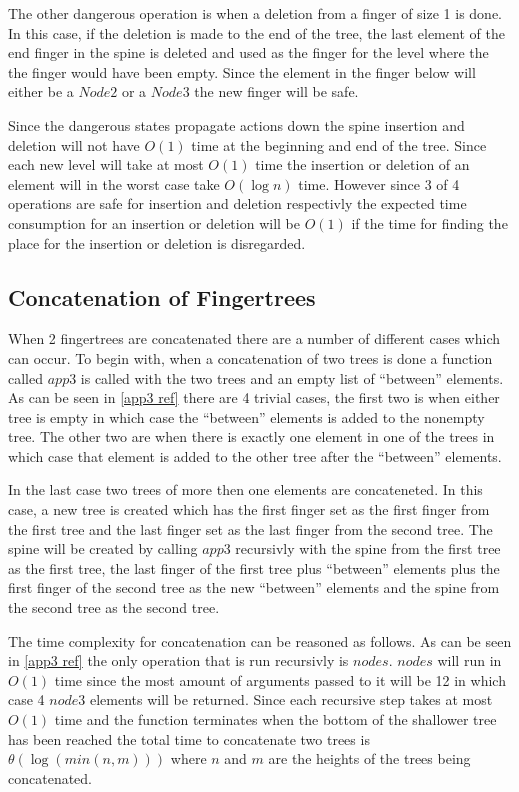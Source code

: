 The other dangerous operation is when a deletion from a finger of size 1 is
done. In this case, if the deletion is made to the end of the tree, the last
element of the end finger in the spine is deleted and used as the finger for the
level where the the finger would have been empty. Since the element in the
finger below will either be a $Node2$ or a $Node3$ the new finger will be safe.

Since the dangerous states propagate actions down the spine insertion and
deletion will not have $O(1)$ time at the beginning and end of the tree. Since
each new level will take at most $O(1)$ time the insertion or deletion of an
element will in the worst case take $O(\log n)$ time. However since 3 of 4
operations are safe for insertion and deletion respectivly the expected time
consumption for an insertion or deletion will be $O(1)$ if the time for finding
the place for the insertion or deletion is disregarded.

\subsection{Concatenation of Fingertrees}
When 2 fingertrees are concatenated there are a number of different cases which
can occur. To begin with, when a concatenation of two trees is done a function
called $app3$ is called with the two trees and an empty list of ``between''
elements. As can be seen in \cref{app3 ref} there are 4 trivial cases, the first
two is when either tree is empty in which case the ``between'' elements is
added to the nonempty tree. The other two are when there is exactly one element
in one of the trees in which case that element is added to the other tree after
the ``between'' elements.

In the last case two trees of more then one elements
are concateneted. In this case, a new tree is created which has the first
finger set as the first finger from the first tree and the last finger set as
the last finger from the second tree. The spine will be created by calling
$app3$ recursivly with the spine from the first tree as the first tree, the last
finger of the first tree plus ``between'' elements plus the first finger of the
second tree as the new ``between'' elements and the spine from the second tree
as the second tree.

The time complexity for concatenation can be reasoned as follows. As can be seen
in \cref{app3 ref} the only operation that is run recursivly is $nodes$. $nodes$
will run in $O(1)$ time since the most amount of arguments passed to it will be
12 in which case 4 $node3$ elements will be returned. Since each recursive step
takes at most $O(1)$ time and the function terminates when the bottom of the
shallower tree has been reached the total time to concatenate two trees is
$\theta(\log(min(n,m)))$ where $n$ and $m$ are the heights of the trees being
concatenated.

